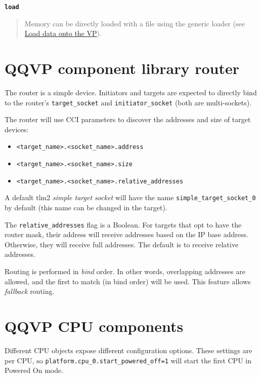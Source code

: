 {\textbf {\footnotesize{\lstinline!load!}}}
\vspace{-2pt}
\begin{quote}
Memory can be directly loaded with a file using the generic loader (see \hyperref[sec:load-data-on-vp]{Load data onto the VP}).
\end{quote}


\section{QQVP component library router}

The router is a simple device. Initiators and targets are expected to directly bind to the router's {\small{\lstinline!target_socket!}} and {\small{\lstinline!initiator_socket!}} (both are multi-sockets).

The router will use CCI parameters to discover the addresses and size of target devices:

\begin{itemize}
\item {\small{\lstinline!<target_name>.<socket_name>.address!}}
\item {\small{\lstinline!<target_name>.<socket_name>.size!}}
\item {\small{\lstinline!<target_name>.<socket_name>.relative_addresses!}}
\end{itemize}

A default tlm2 \emph{simple target socket} will have the name {\small{\lstinline!simple_target_socket_0!}} by default (this name can be changed in the target).

The {\small{\lstinline!relative_addresses!}} flag is a Boolean. For targets that opt to have the router mask, their address will receive addresses based on the IP base address. Otherwise, they will receive full addresses. The default is to receive relative addresses.

\note Routing is performed in \emph{bind} order. In other words, overlapping addresses are allowed, and the first to match (in bind order) will be used. This feature allows \emph{fallback} routing.


\clearpage
\section{QQVP CPU components}

Different CPU objects expose different configuration options. These settings are per CPU, so {\small{\lstinline!platform.cpu_0.start_powered_off=1!}} will start the first CPU in Powered On mode.

